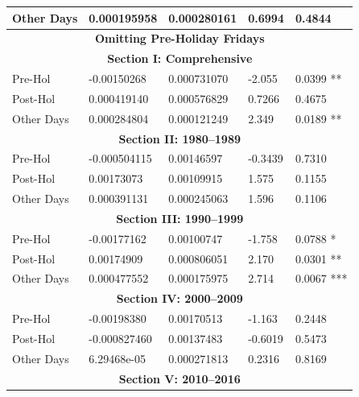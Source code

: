 \documentclass[11pt, english]{article}
\begin{document}
\begin{center}
\begin{longtable}{p{2cm}p{2cm}p{2cm}p{2cm}p{2cm}}
                Other Days & 0.000195958 & 0.000280161 & 0.6994 &  0.4844\\
                \hline
                \hline                                 
                \multicolumn{5}{c}{\textbf{Omitting Pre-Holiday Fridays}}\\         
                \hline
                \hline                                                 
                \multicolumn{5}{c}{\textbf{Section I: Comprehensive}}\\
                \hline            
                Pre-Hol & -0.00150268 & 0.000731070 & -2.055 & 0.0399 **\\ 
                Post-Hol & 0.000419140 & 0.000576829 & 0.7266 & 0.4675\\  
                Other Days & 0.000284804 & 0.000121249 & 2.349 & 0.0189 **\\
                \hline                                          
                \multicolumn{5}{c}{\textbf{Section II: 1980--1989}}\\   
                \hline            
                Pre-Hol & -0.000504115 & 0.00146597 & -0.3439 & 0.7310\\ 
                Post-Hol & 0.00173073 & 0.00109915 & 1.575 & 0.1155\\  
                Other Days & 0.000391131 & 0.000245063 & 1.596 & 0.1106\\
                \hline 
                \multicolumn{5}{c}{\textbf{Section III: 1990--1999}}\\   
                \hline            
                Pre-Hol & -0.00177162 & 0.00100747 & -1.758 & 0.0788 *\\ 
                Post-Hol & 0.00174909 & 0.000806051 & 2.170 & 0.0301 **\\  
                Other Days & 0.000477552 & 0.000175975 & 2.714 & 0.0067 ***\\
                \hline 
                \multicolumn{5}{c}{\textbf{Section IV: 2000--2009}}\\   
                \hline                                          
                Pre-Hol & -0.00198380 & 0.00170513 & -1.163 & 0.2448\\
                Post-Hol & -0.000827460 & 0.00137483 & -0.6019 & 0.5473\\  
                Other Days & 6.29468e-05 & 0.000271813 & 0.2316 & 0.8169\\
                \hline 
                \multicolumn{5}{c}{\textbf{Section V: 2010--2016}}\\   

\end{longtable}
\end{center}
\end{document}
